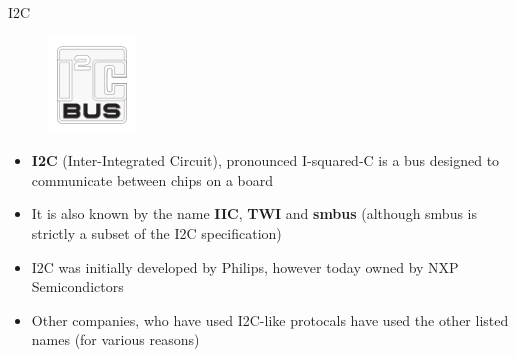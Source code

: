 \begin{frame}
   {I2C}
   \begin{figure}[H]
      \centering
      \includegraphics[height=1in]{IMAGES/i2c-logo}
   \end{figure}
   \begin{itemize}
      \item \textbf{I2C} (Inter-Integrated Circuit), pronounced I-squared-C
	      is a bus designed to communicate between chips on a board
      \item It is also known by the name \textbf{IIC}, \textbf{TWI} and \textbf{smbus}
	      (although smbus is strictly a subset of the I2C specification)
      \item I2C was initially developed by Philips,
	      however today owned by NXP Semicondictors
      \item Other companies, who have used I2C-like protocals have used the
	      other listed names (for various reasons)
   \end{itemize}
\end{frame}

\cprotect\note{

}

